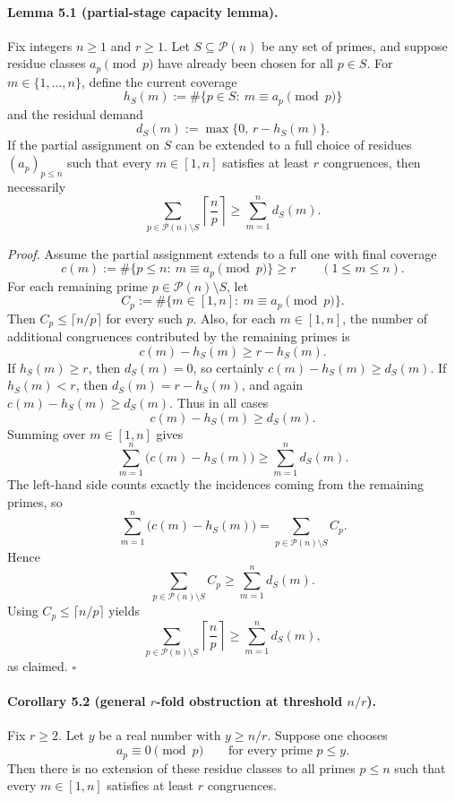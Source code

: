 \paragraph{Lemma 5.1 (partial-stage capacity lemma).}
Fix integers \(n\ge 1\) and \(r\ge 1\).
Let \(S\subseteq \mathcal P(n)\) be any set of primes, and suppose residue classes \(a_p\pmod p\) have already been chosen for all \(p\in S\).
For \(m\in\{1,\dots,n\}\), define the current coverage
\[
h_S(m):=\#\{p\in S:\ m\equiv a_p\pmod p\}
\]
and the residual demand
\[
d_S(m):=\max\{0,\,r-h_S(m)\}.
\]
If the partial assignment on \(S\) can be extended to a full choice of residues \((a_p)_{p\le n}\)
such that every \(m\in[1,n]\) satisfies at least \(r\) congruences, then necessarily
\[
\sum_{p\in\mathcal P(n)\setminus S}\left\lceil \frac{n}{p}\right\rceil
\ge
\sum_{m=1}^n d_S(m).
\]

\emph{Proof.}
Assume the partial assignment extends to a full one with final coverage
\[
c(m):=\#\{p\le n:\ m\equiv a_p\pmod p\}\ge r
\qquad (1\le m\le n).
\]
For each remaining prime \(p\in \mathcal P(n)\setminus S\), let
\[
C_p:=\#\{m\in[1,n]:\ m\equiv a_p\pmod p\}.
\]
Then \(C_p\le \lceil n/p\rceil\) for every such \(p\).
Also, for each \(m\in[1,n]\), the number of additional congruences contributed by the remaining primes is
\[
c(m)-h_S(m)\ge r-h_S(m).
\]
If \(h_S(m)\ge r\), then \(d_S(m)=0\), so certainly \(c(m)-h_S(m)\ge d_S(m)\).
If \(h_S(m)<r\), then \(d_S(m)=r-h_S(m)\), and again \(c(m)-h_S(m)\ge d_S(m)\).
Thus in all cases
\[
c(m)-h_S(m)\ge d_S(m).
\]
Summing over \(m\in[1,n]\) gives
\[
\sum_{m=1}^n \bigl(c(m)-h_S(m)\bigr)
\ge
\sum_{m=1}^n d_S(m).
\]
The left-hand side counts exactly the incidences coming from the remaining primes, so
\[
\sum_{m=1}^n \bigl(c(m)-h_S(m)\bigr)=\sum_{p\in\mathcal P(n)\setminus S} C_p.
\]
Hence
\[
\sum_{p\in\mathcal P(n)\setminus S} C_p
\ge
\sum_{m=1}^n d_S(m).
\]
Using \(C_p\le \lceil n/p\rceil\) yields
\[
\sum_{p\in\mathcal P(n)\setminus S}\left\lceil \frac{n}{p}\right\rceil
\ge
\sum_{m=1}^n d_S(m),
\]
as claimed.
\hfill$\square$

\paragraph{Corollary 5.2 (general \(r\)-fold obstruction at threshold \(n/r\)).}
Fix \(r\ge 2\). Let \(y\) be a real number with \(y\ge n/r\).
Suppose one chooses
\[
a_p\equiv 0\pmod p \qquad\text{for every prime }p\le y.
\]
Then there is no extension of these residue classes to all primes \(p\le n\) such that every \(m\in[1,n]\) satisfies at least \(r\) congruences.

